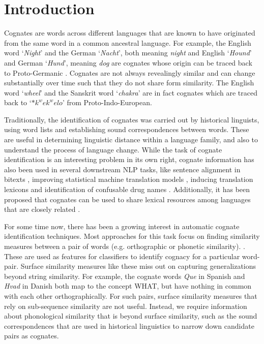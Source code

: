 \chapter{Introduction}

Cognates are words across different languages that are known to have originated from the same word in a common ancestral language. For example, the English word `\textit{Night}' and the German `\textit{Nacht}', both meaning \textit{night} and English `\textit{Hound}' and German `\textit{Hund}', meaning \textit{dog} are cognates whose origin can be traced back to Proto-Germanic \cite{rama2015automatic}. Cognates are not always revealingly similar and can change substantially over time such that they do not share form similarity. The English word `\textit{wheel}' and the Sanskrit word `\textit{chakra}' are in fact cognates which are traced back to `$*k^wek^welo$' from Proto-Indo-European.

Traditionally, the identification of cognates was carried out by historical linguists, using word lists and establishing sound correspondences between words. These are useful in determining linguistic distance within a language family, and also to understand the process of language change. While the task of cognate identification is an interesting problem in its own right, cognate information has also been used in several downstream NLP tasks, like sentence alignment in bitexts \cite{simard1993using}, improving statistical machine translation models \cite{kondrak2003cognates}, inducing translation lexicons \cite{mann2001multipath}\cite{tufis2002cheap} and identification of confusable drug names \cite{kondrak2004identification}. Additionally, it has been proposed that cognates can be used to share lexical resources among languages that are closely related \citep{Singh:07b}. 

For some time now, there has been a growing interest in automatic cognate identification techniques. Most approaches for this task focus on finding similarity measures between a pair of words (e.g. orthographic or phonetic similarity). \cite{hauer2011clustering} \cite{inkpen2005similarity} \cite{List2016g}. These are used as features for classifiers to identify cognacy for a particular word-pair. Surface similarity measures like these miss out on capturing generalizations beyond string similarity. For example, the cognate words \textit{Que} in Spanish and \textit{Hvad} in Danish both map to the concept \textsc{WHAT}, but have nothing in common with each other orthographically. For such pairs, surface similarity measures that rely on sub-sequence similarity are not useful. Instead, we require information about phonological similarity that is beyond surface similarity, such as the sound correspondences that are used in historical linguistics to narrow down candidate pairs as cognates.

